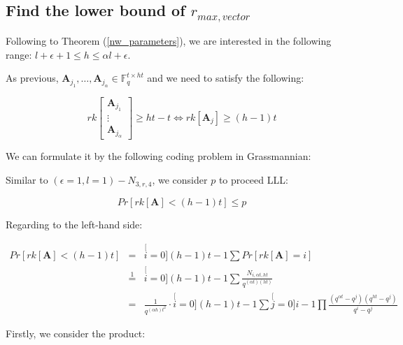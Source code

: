 \subsection{Find the lower bound of $r_{max,vector}$}

Following to Theorem (\ref{nw_parameters}), we are interested in
the following range: $l+\epsilon+1\leq h\leq\alpha l+\epsilon$.

As previous, $\boldsymbol{A}_{j_{1}},\ldots,\boldsymbol{A}_{j_{\alpha}}\in\ensuremath{\mathbb{F}}_{q}^{t\times ht}$
and we need to satisfy the following:

\[
rk\left[\begin{array}{c}
\boldsymbol{A}_{j_{1}}\\
\vdots\\
\boldsymbol{A}_{j_{\alpha}}
\end{array}\right]\geq ht-t\Leftrightarrow rk\left[\boldsymbol{A}_{j}\right]\geq(h-1)t
\]

We can formulate it by the following coding problem in Grassmannian:

\noindent{}

Similar to $\left(\epsilon=1,l=1\right)-\ensuremath{N}_{3,r,4}$,
we consider $p$ to proceed LLL:

\[
Pr\left[rk\left[\boldsymbol{A}\right]<(h-1)t\right]\leq p
\]

Regarding to the left-hand side:

\begin{eqnarray}
Pr\left[rk\left[\boldsymbol{A}\right]<(h-1)t\right] & = & \stackrel[i=0]{(h-1)t-1}{\mathop{\sum}}Pr\left[rk\left[\boldsymbol{A}\right]=i\right]\nonumber \\
 & \overset{1}{=} & \stackrel[i=0]{(h-1)t-1}{\mathop{\sum}}\frac{N_{i,\alpha t,ht}}{q^{\left(\alpha t\right)\left(ht\right)}}\nonumber \\
 & = & \frac{1}{q^{\left(\alpha h\right)t^{2}}}\cdot\stackrel[i=0]{(h-1)t-1}{\mathop{\sum}}\stackrel[j=0]{i-1}{\mathop{\prod}}\frac{\left(q^{\alpha t}-q^{j}\right)\left(q^{ht}-q^{j}\right)}{q^{i}-q^{j}}\label{eq:general_nw_calc_p}
\end{eqnarray}

Firstly, we consider the product:

